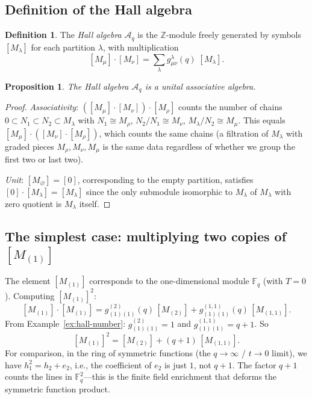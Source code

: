 \documentclass[12pt,a4paper]{article}
\newtheorem{proposition}[theorem]{Proposition}
\theoremstyle{definition}
\newtheorem{definition}[theorem]{Definition}
\theoremstyle{remark}
\newcommand{\Z}{\mathbb{Z}}
\newcommand{\F}{\mathbb{F}}
\begin{document}
\subsection{Definition of the Hall algebra}

\begin{definition}\label{def:hall-algebra}
The \emph{Hall algebra} $\mathcal{A}_q$ is the $\Z$-module freely
generated by symbols $[M_\lambda]$ for each partition $\lambda$, with
multiplication
\begin{equation}\label{eq:hall-mult}
  [M_\mu] \cdot [M_\nu] =
  \sum_\lambda g^\lambda_{\mu\nu}(q)\; [M_\lambda].
\end{equation}
\end{definition}

\begin{proposition}
The Hall algebra $\mathcal{A}_q$ is a unital associative algebra.
\end{proposition}

\begin{proof}
\emph{Associativity}: $([M_\mu] \cdot [M_\nu]) \cdot [M_\rho]$ counts
the number of chains $0 \subset N_1 \subset N_2 \subset M_\lambda$
with $N_1 \cong M_\rho$, $N_2/N_1 \cong M_\nu$,
$M_\lambda/N_2 \cong M_\mu$. This equals
$[M_\mu] \cdot ([M_\nu] \cdot [M_\rho])$, which counts the same chains
(a filtration of $M_\lambda$ with graded pieces $M_\rho, M_\nu, M_\mu$
is the same data regardless of whether we group the first two or last
two).

\emph{Unit}: $[M_\varnothing] = [0]$, corresponding to the empty
partition, satisfies $[0] \cdot [M_\lambda] = [M_\lambda]$ since the
only submodule isomorphic to $M_\lambda$ of $M_\lambda$ with zero
quotient is $M_\lambda$ itself.
\end{proof}

\subsection{The simplest case: multiplying two copies of $[M_{(1)}]$}

The element $[M_{(1)}]$ corresponds to the one-dimensional module
$\F_q$ (with $T = 0$). Computing $[M_{(1)}]^2$:
\[
  [M_{(1)}] \cdot [M_{(1)}]
  = g^{(2)}_{(1)(1)}(q)\, [M_{(2)}]
  + g^{(1,1)}_{(1)(1)}(q)\, [M_{(1,1)}].
\]
From Example~\ref{ex:hall-number}: $g^{(2)}_{(1)(1)} = 1$ and
$g^{(1,1)}_{(1)(1)} = q + 1$. So
\begin{equation}\label{eq:hall-square}
  [M_{(1)}]^2 = [M_{(2)}] + (q+1)\,[M_{(1,1)}].
\end{equation}
For comparison, in the ring of symmetric functions (the $q \to \infty$
/ $t \to 0$ limit), we have $h_1^2 = h_2 + e_2$, i.e., the
coefficient of $e_2$ is just $1$, not $q + 1$. The factor $q + 1$
counts the lines in $\F_q^2$---this is the finite field enrichment
that deforms the symmetric function product.
\end{document}
